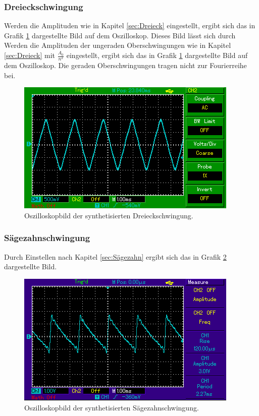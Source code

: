 \subsubsection{Dreieckschwingung}
Werden die Amplituden wie in Kapitel \ref{sec:Dreieck} eingestellt, ergibt sich das in
Grafik \ref{abb:2} dargestellte Bild auf dem Oszilloskop. Dieses Bild lässt sich durch
Werden die Amplituden  der ungeraden Oberschwingungen wie in Kapitel \ref{sec:Dreieck} mit $\frac{A_0}{n^2}$ eingestellt,
ergibt sich das in Grafik \ref{abb:2} dargestellte Bild auf dem Oszilloskop. Die geraden Oberschwingungen tragen nicht
zur Fourierreihe bei.
\begin{figure}
  \centering
  \includegraphics[scale=0.4]{Dreieck.png}
  \caption{Oszilloskopbild der synthetisierten Dreieckschwingung.}
  \label{abb:2}
\end{figure}
\subsubsection{Sägezahnschwingung}
Durch Einstellen nach Kapitel \ref{sec:Sägezahn} ergibt sich das in Grafik \ref{abb:3} dargestellte
Bild.
\begin{figure}
  \centering
  \includegraphics[scale=0.4]{Saegezahn.png}
  \caption{Oszilloskopbild der synthetisierten Sägezahnschwingung.}
  \label{abb:3}
\end{figure}
